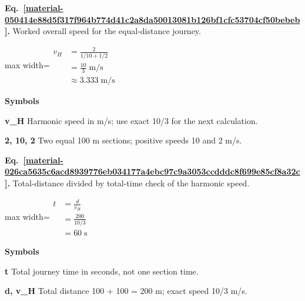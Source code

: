 \documentclass[11pt,a4paper]{article}
\begin{document}
\par\medskip
\noindent\begin{minipage}{\linewidth}
\label{material-050414e88d5f317f964b774d41c2a8da50013081b126bf1cfc53704cf50bebeb}
\noindent\textbf{Eq.~\ref*{material-050414e88d5f317f964b774d41c2a8da50013081b126bf1cfc53704cf50bebeb}.} Worked overall speed for the equal-distance journey.\par\nopagebreak
\begin{center}\begin{adjustbox}{max width=\linewidth}$\displaystyle \begin{aligned}v_H&=\frac{2}{1/10+1/2}\\&=\frac{10}{3}\;\mathrm{m/s}\\&\approx3.333\;\mathrm{m/s}\end{aligned}$\end{adjustbox}\end{center}

\par\noindent\textbf{Symbols}

\par\noindent\textbf{v\_H} Harmonic speed in m/s; use exact 10/3 for the next calculation.

\par\noindent\textbf{2, 10, 2} Two equal 100 m sections; positive speeds 10 and 2 m/s.

\end{minipage}\par
\medskip

\par\medskip
\noindent\begin{minipage}{\linewidth}
\label{material-026ca5635c6acd8939776eb034177a4ebc97c9a3053ccdddc8f699e85cf8a32c}
\noindent\textbf{Eq.~\ref*{material-026ca5635c6acd8939776eb034177a4ebc97c9a3053ccdddc8f699e85cf8a32c}.} Total-distance divided by total-time check of the harmonic speed.\par\nopagebreak
\begin{center}\begin{adjustbox}{max width=\linewidth}$\displaystyle \begin{aligned}t&=\frac{d}{v_H}\\&=\frac{200}{10/3}\\&=60\;\mathrm{s}\end{aligned}$\end{adjustbox}\end{center}

\par\noindent\textbf{Symbols}

\par\noindent\textbf{t} Total journey time in seconds, not one section time.

\par\noindent\textbf{d, v\_H} Total distance 100 + 100 = 200 m; exact speed 10/3 m/s.

\end{minipage}\par
\medskip
\end{document}
